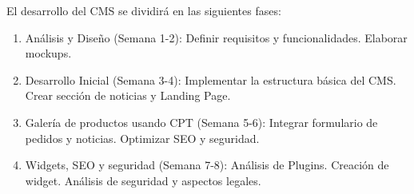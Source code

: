 \documentclass[a4paper]{article}
\begin{document}
El desarrollo del CMS se dividirá en las siguientes fases:

\begin{enumerate}

    \item Análisis y Diseño (Semana 1-2): Definir requisitos y funcionalidades. Elaborar mockups.

    \item Desarrollo Inicial (Semana 3-4): Implementar la estructura básica del CMS. Crear sección de noticias y Landing Page.

    \item Galería de productos usando CPT (Semana 5-6): Integrar formulario de pedidos y noticias. Optimizar SEO y seguridad.

    \item Widgets, SEO y seguridad (Semana 7-8): Análisis de Plugins. Creación de widget. Análisis de seguridad y aspectos legales.

\end{enumerate}
\end{document}

